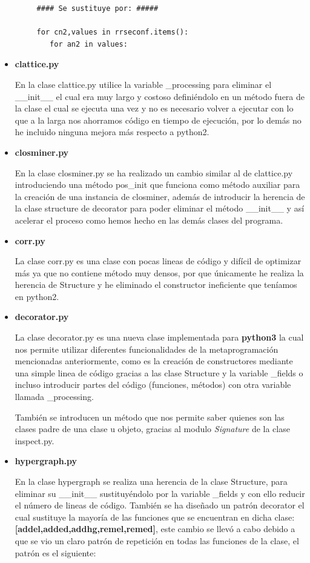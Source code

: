 \documentclass{cosas/tfg_domingo}
\begin{document}
\begin{itemize}
\begin{verbatim}
     #### Se sustituye por: #####
     
     for cn2,values in rrseconf.items():
        for an2 in values:
\end{verbatim}

\item \textbf{clattice.py}

En la clase clattice.py utilice la variable \_processing para eliminar el \_\_init\_\_ el cual era muy largo y costoso definiéndolo en un método fuera de la clase el cual se ejecuta una vez y no es necesario volver a ejecutar con lo que a la larga nos ahorramos código en tiempo de ejecución, por lo demás no he incluido ninguna mejora más respecto a python2.

\item \textbf{closminer.py}

En la clase closminer.py se ha realizado un cambio similar al de clattice.py introduciendo una método pos\_init que funciona como método auxiliar para la creación de una instancia de closminer, además de introducir la herencia de la clase structure de decorator para poder eliminar el método \_\_init\_\_ y así acelerar el proceso como hemos hecho en las demás clases del programa.

\item \textbf{corr.py}

La clase corr.py es una clase con pocas lineas de código y difícil de optimizar más ya que no contiene método muy densos, por que únicamente he realiza la herencia de Structure y he eliminado el constructor ineficiente que teníamos en python2.

\item \textbf{decorator.py}

La clase decorator.py es una nueva clase implementada para \textbf{python3} la cual nos permite utilizar diferentes funcionalidades de la metaprogramación mencionadas anteriormente, como es la creación de constructores mediante una simple linea de código gracias a las clase Structure  y la variable \_fields o incluso introducir partes del código (funciones, métodos) con otra variable llamada \_processing.

También se introducen un método que nos permite saber quienes son las clases padre de una clase u objeto, gracias al modulo \textit{Signature} de la clase inspect.py.

\item \textbf{hypergraph.py}

En la clase hypergraph se realiza una herencia de la clase Structure, para eliminar su \_\_init\_\_ sustituyéndolo por la variable \_fields y con ello reducir el número de lineas de código.
También se ha diseñado un patrón decorator el cual sustituye la mayoría de las funciones que se encuentran en dicha clase:  \textbf{[addel,added,addhg,remel,remed]}, este cambio se llevó a cabo debido a que se vio un claro patrón de repetición en todas las funciones de la clase, el patrón es el siguiente:


\end{itemize}
\end{document}
